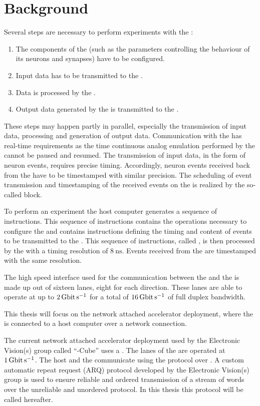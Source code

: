 \section{Background}
Several steps are necessary to perform experiments with the \HICANNX{}:
\begin{enumerate}
\item The components of the \ASIC{} (such as the parameters controlling the behaviour of its neurons and synapses) have to be configured.
\item Input data has to be transmitted to the \ASIC{}.
\item Data is processed by the \ASIC{}.
\item Output data generated by the \ASIC{} is transmitted to the \FPGA{}.
\end{enumerate}
These steps may happen partly in parallel, especially the transmission of input data, processing and generation of output data. Communication with the \ASIC{} has real-time requirements as the time continuous analog emulation performed by the \ASIC{} cannot be paused and resumed. The transmission of input data, in the form of neuron events, requires precise timing. Accordingly, neuron events received back from the \ASIC{} have to be timestamped with similar precision.
The scheduling of event transmission and timestamping of the received events on the \FPGA{} is realized by the so-called \pbexec{} block.

To perform an experiment the host computer generates a sequence of instructions. This sequence of instructions contains the operations necessary to configure the \ASIC{} and contains instructions defining the timing and content of events to be transmitted to the \ASIC{}.
This sequence of instructions, called \PlaybackProgram{}, is then processed by the \pbexec{} with a timing resolution of $\SI{8}{\nano\second}$.
Events received from the \ASIC{} are timestamped with the same resolution.

The high speed interface used for the communication between the \ASIC{} and the \FPGA{} is made up out of sixteen \LVDS{} lanes, eight for each direction. These lanes are able to operate at up to $\SI{2}{\giga\bit\per\second}$ for a total of $\SI{16}{\giga\bit\per\second}$ of full duplex bandwidth.

This thesis will focus on the network attached accelerator deployment, where the \FPGA{} is connected to a host computer over a network connection.

The current network attached accelerator deployment used by the Electronic Vision(s) group called ``\BSSTwo{}-Cube''\autocite{ref:bss_cube} uses a \Xilinx{}  \FPGA{}. The \LVDS{} lanes of the \ASIC{} are operated at $\SI{1}{\giga\bit\per\second}$. The host and the \FPGA{} communicate using the \UDP{} protocol over \Gigabitethernet{}. A custom automatic repeat request (ARQ) protocol\autocite{ref:hostarq} developed by the Electronic Vision(s) group is used to ensure reliable and ordered transmission of a stream of \PhyWordSize{} words over the unreliable and unordered \UDP{} protocol. In this thesis this protocol will be called \HostARQ{} hereafter.

